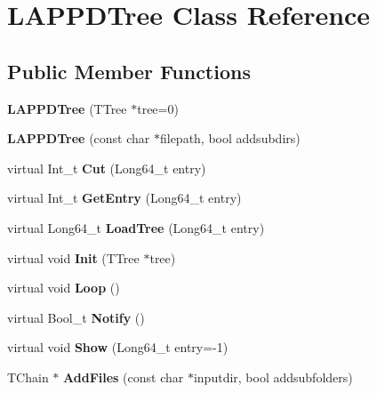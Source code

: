 \hypertarget{classLAPPDTree}{\section{L\-A\-P\-P\-D\-Tree Class Reference}
\label{classLAPPDTree}
}
\subsection*{Public Member Functions}
\begin{DoxyCompactItemize}
\item 
\hypertarget{classLAPPDTree_abb24c0d515c12bc1809d5d0bf7c6abc6}{{\bfseries L\-A\-P\-P\-D\-Tree} (T\-Tree $\ast$tree=0)}\label{classLAPPDTree_abb24c0d515c12bc1809d5d0bf7c6abc6}

\item 
\hypertarget{classLAPPDTree_a1f59d9cca524a5cc0a9a8c525b94d1b1}{{\bfseries L\-A\-P\-P\-D\-Tree} (const char $\ast$filepath, bool addsubdirs)}\label{classLAPPDTree_a1f59d9cca524a5cc0a9a8c525b94d1b1}

\item 
\hypertarget{classLAPPDTree_a6de6bc7aa0dbf3bb246fbaae06723244}{virtual Int\-\_\-t {\bfseries Cut} (Long64\-\_\-t entry)}\label{classLAPPDTree_a6de6bc7aa0dbf3bb246fbaae06723244}

\item 
\hypertarget{classLAPPDTree_a0ae74d3f6b190e015bc109d039f4f9a8}{virtual Int\-\_\-t {\bfseries Get\-Entry} (Long64\-\_\-t entry)}\label{classLAPPDTree_a0ae74d3f6b190e015bc109d039f4f9a8}

\item 
\hypertarget{classLAPPDTree_a9047fa387962f63c3da57a5fe9dd31e1}{virtual Long64\-\_\-t {\bfseries Load\-Tree} (Long64\-\_\-t entry)}\label{classLAPPDTree_a9047fa387962f63c3da57a5fe9dd31e1}

\item 
\hypertarget{classLAPPDTree_a347e8109500ef62ace4bbc0d89890918}{virtual void {\bfseries Init} (T\-Tree $\ast$tree)}\label{classLAPPDTree_a347e8109500ef62ace4bbc0d89890918}

\item 
\hypertarget{classLAPPDTree_ad16b2af53b7d2ab9a2f63514cd0de6b4}{virtual void {\bfseries Loop} ()}\label{classLAPPDTree_ad16b2af53b7d2ab9a2f63514cd0de6b4}

\item 
\hypertarget{classLAPPDTree_a404d7028c21e7c2e0c6339b917c3ca67}{virtual Bool\-\_\-t {\bfseries Notify} ()}\label{classLAPPDTree_a404d7028c21e7c2e0c6339b917c3ca67}

\item 
\hypertarget{classLAPPDTree_a7d7520170ee101a91a5003e09b55c9a6}{virtual void {\bfseries Show} (Long64\-\_\-t entry=-\/1)}\label{classLAPPDTree_a7d7520170ee101a91a5003e09b55c9a6}

\item 
\hypertarget{classLAPPDTree_aa2436cb85efeec18ff4e05c9fda41359}{T\-Chain $\ast$ {\bfseries Add\-Files} (const char $\ast$inputdir, bool addsubfolders)}\label{classLAPPDTree_aa2436cb85efeec18ff4e05c9fda41359}

\end{DoxyCompactItemize}
